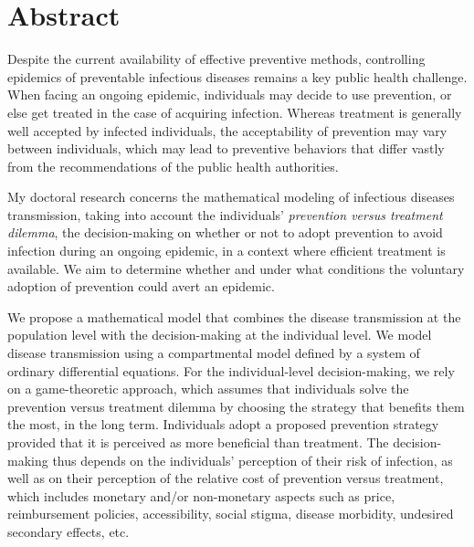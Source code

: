
\chapter*{\centering \Large \vspace{-3cm}
		Abstract
		\vspace{-0.5cm}}

\small

Despite the current availability of effective preventive methods, controlling epidemics of preventable infectious diseases remains a key public health challenge. When facing an ongoing epidemic, individuals may decide to use prevention, or else get treated in the case of acquiring infection. Whereas treatment is generally well accepted by infected individuals, the acceptability of prevention may vary between individuals, which may lead to preventive behaviors that differ vastly from the recommendations of the public health authorities. 

My doctoral research concerns the mathematical modeling of infectious diseases transmission, taking into account the individuals' {\it prevention versus treatment dilemma}, the decision-making on whether or not to adopt prevention to avoid infection during an ongoing epidemic, in a context where efficient treatment is available. We aim to determine whether and under what conditions the voluntary adoption of prevention could avert an epidemic. 


We propose a mathematical model that combines the disease transmission at the population level with the decision-making at the individual level. We model disease transmission using a compartmental model defined by a system of ordinary differential equations. For the individual-level decision-making, we rely on a game-theoretic approach, which assumes that individuals solve the prevention versus treatment dilemma by choosing the strategy that benefits them the most, in the long term. Individuals adopt a proposed prevention strategy provided that it is perceived as more beneficial than treatment. The decision-making thus depends on the individuals' perception of their risk of infection, as well as on their perception of the relative cost of prevention versus treatment, which includes monetary and/or non-monetary aspects such as price, reimbursement policies, accessibility, social stigma, disease morbidity, undesired secondary effects, etc. 

